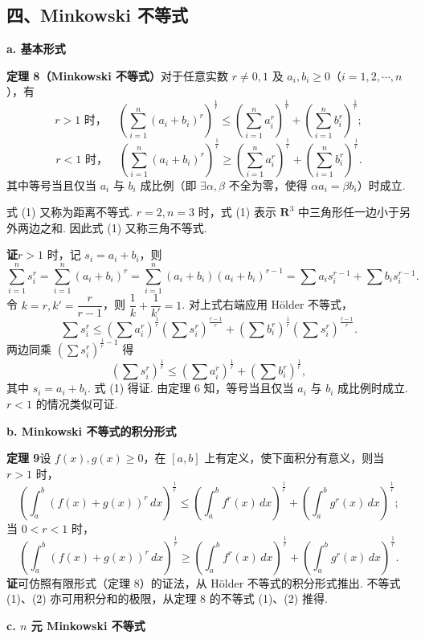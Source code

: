 \documentclass[UTF8, 12pt, fontset=fandol, oneside]{ctexart}
\begin{document}
\subsection*{四、Minkowski 不等式}

\noindent\textbf{a. 基本形式}

\noindent\textbf{定理 8（Minkowski 不等式）}\quad 对于任意实数 $r\ne0,1$ 及 $a_i,b_i\ge0$（$i=1,2,\cdots,n$），有
\[
r>1\text{ 时，}\quad
\left(\sum_{i=1}^n(a_i+b_i)^r\right)^{\frac1r}
\le\left(\sum_{i=1}^n a_i^r\right)^{\frac1r}
+\left(\sum_{i=1}^n b_i^r\right)^{\frac1r}; \tag{1}
\]
\[
r<1\text{ 时，}\quad
\left(\sum_{i=1}^n(a_i+b_i)^r\right)^{\frac1r}
\ge\left(\sum_{i=1}^n a_i^r\right)^{\frac1r}
+\left(\sum_{i=1}^n b_i^r\right)^{\frac1r}. \tag{2}
\]
其中等号当且仅当 $a_i$ 与 $b_i$ 成比例（即 $\exists\alpha,\beta$ 不全为零，使得 $\alpha a_i=\beta b_i$）时成立.

式 (1) 又称为距离不等式. $r=2,n=3$ 时，式 (1) 表示 $\mathbf{R}^3$ 中三角形任一边小于另外两边之和. 因此式 (1) 又称三角不等式.

\noindent\textbf{证}\quad $r>1$ 时，记 $s_i=a_i+b_i$，则
\[
\sum_{i=1}^n s_i^r
=\sum_{i=1}^n(a_i+b_i)^r
=\sum_{i=1}^n(a_i+b_i)(a_i+b_i)^{r-1}
=\sum a_i s_i^{r-1}+\sum b_i s_i^{r-1}.
\]
令 $k=r,k'=\dfrac r{r-1}$，则 $\dfrac1k+\dfrac1{k'}=1$. 对上式右端应用 Hölder 不等式，
\[
\sum s_i^r
\le \left(\sum a_i^r\right)^{\frac1r}\left(\sum s_i^r\right)^{\frac{r-1}{r}}
+\left(\sum b_i^r\right)^{\frac1r}\left(\sum s_i^r\right)^{\frac{r-1}{r}}.
\]
两边同乘 $\left(\sum s_i^r\right)^{\frac1r-1}$ 得
\[
\left(\sum s_i^r\right)^{\frac1r}
\le\left(\sum a_i^r\right)^{\frac1r}
+\left(\sum b_i^r\right)^{\frac1r},
\]
其中 $s_i=a_i+b_i$. 式 (1) 得证. 由定理 6 知，等号当且仅当 $a_i$ 与 $b_i$ 成比例时成立.
$r<1$ 的情况类似可证.

\noindent\textbf{b. Minkowski 不等式的积分形式}

\noindent\textbf{定理 9}\quad 设 $f(x),g(x)\ge0$，在 $[a,b]$ 上有定义，使下面积分有意义，则当 $r>1$ 时，
\[
\left(\int_a^b(f(x)+g(x))^r\,dx\right)^{\frac1r}
\le \left(\int_a^b f^r(x)\,dx\right)^{\frac1r}
+\left(\int_a^b g^r(x)\,dx\right)^{\frac1r}; \tag{1}
\]
当 $0<r<1$ 时，
\[
\left(\int_a^b(f(x)+g(x))^r\,dx\right)^{\frac1r}
\ge \left(\int_a^b f^r(x)\,dx\right)^{\frac1r}
+\left(\int_a^b g^r(x)\,dx\right)^{\frac1r}. \tag{2}
\]
\noindent\textbf{证}\quad 可仿照有限形式（定理 8）的证法，从 Hölder 不等式的积分形式推出. 不等式 (1)、(2) 亦可用积分和的极限，从定理 8 的不等式 (1)、(2) 推得.

\noindent\textbf{c. $n$ 元 Minkowski 不等式}
\end{document}
